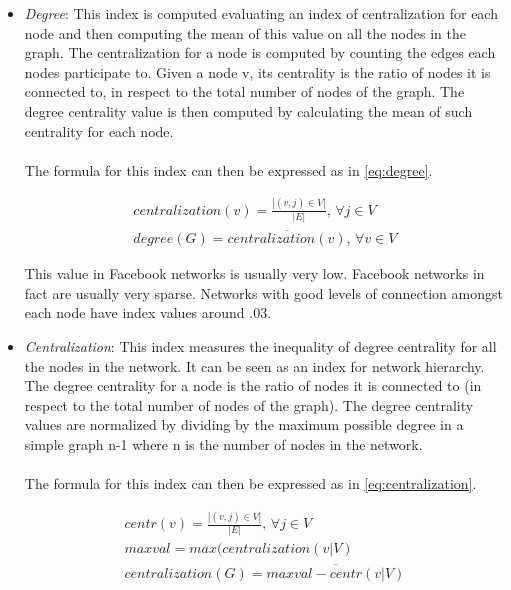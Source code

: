 \begin{itemize}
\item \emph{Degree}: This index is computed evaluating an index of centralization for each node and then computing the mean of this value on all the nodes in the graph.
The centralization for a node is computed by counting the edges each nodes participate to.
Given a node v, its centrality is the ratio of nodes it is connected to, in respect to the total number of nodes of the graph.
The degree centrality value is then computed by calculating the mean of such centrality for each node.\\
\\
The formula for this index can then be expressed as in \ref{eq:degree}.

\begin{equation}
\begin{split}
centralization(v) = \frac{\left | (v, j) \in V \right |}{\left | E \right |}
\textrm{, } \forall j \in V \\
degree(G) = \overline{centralization(v)}
\textrm{, } \forall v \in V
\end{split}
\label{eq:degree}
\end{equation}

This value in Facebook networks is usually very low.
Facebook networks in fact are usually very sparse.
Networks with good levels of connection amongst each node have index values around .03.

\item \emph{Centralization}: This index measures the inequality of degree centrality for all the nodes in the network.
It can be seen as an index for network hierarchy.
The degree centrality for a node is the ratio of nodes it is connected to (in respect to the total number of nodes of the graph).
The degree centrality values are normalized by dividing by the maximum possible degree in a simple graph n-1 where n is the number of nodes in the network.\\
\\
The formula for this index can then be expressed as in \ref{eq:centralization}.

\begin{equation}
\begin{split}
centr(v) = \frac{\left | (v, j) \in V \right |}{\left | E \right |}
\textrm{, } \forall j \in V \\
maxval = max(centralization(v | V) \\
centralization(G) = \overline{maxval - centr(v | V)}
\end{split}
\label{eq:centralization}
\end{equation}


\end{itemize}
